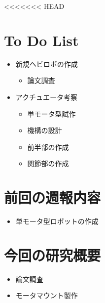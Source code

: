 <<<<<<< HEAD
\section{To Do List}	
	\begin{itemize}
	\item{新規ヘビロボの作成}
		\begin{itemize}
			\item 論文調査 
		\end{itemize}
	\item {アクチュエータ考察}
		\begin{itemize}
			\item{単モータ型試作}
			\item{機構の設計}
			\item{前半部の作成}
			\item{関節部の作成}
		\end{itemize}
	\end{itemize}

\newpage

\section{前回の週報内容}
	\begin{itemize}
	\item{単モータ型ロボットの作成}
	\end{itemize}
	
\section{今回の研究概要}
	\begin{itemize}
		\item{論文調査}
		\item {モータマウント製作}
	\end{itemize}

